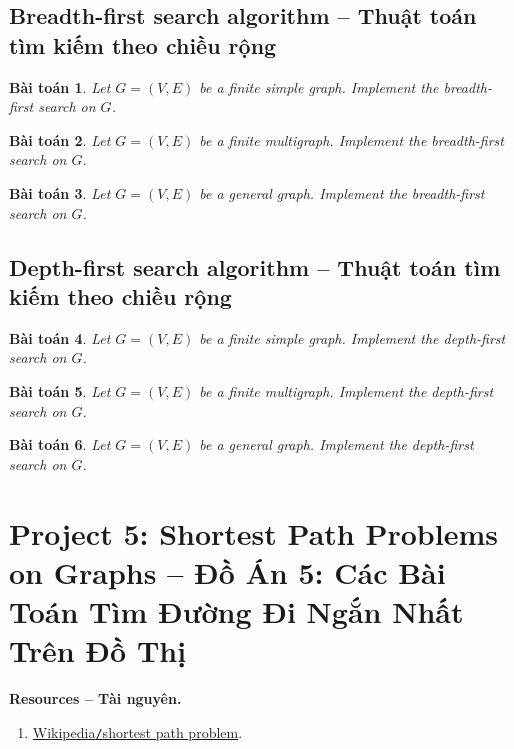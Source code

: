 \documentclass{article}
\newtheorem{baitoan}{Bài toán}
\begin{document}

\subsection{Breadth-first search algorithm -- Thuật toán tìm kiếm theo chiều rộng}

\begin{baitoan}
    Let $G = (V,E)$ be a finite simple graph. Implement the breadth-first search on $G$.
\end{baitoan}

\begin{baitoan}
    Let $G = (V,E)$ be a finite multigraph. Implement the breadth-first search on $G$.
\end{baitoan}

\begin{baitoan}
    Let $G = (V,E)$ be a general graph. Implement the breadth-first search on $G$.
\end{baitoan}


\subsection{Depth-first search algorithm -- Thuật toán tìm kiếm theo chiều rộng}

\begin{baitoan}
    Let $G = (V,E)$ be a finite simple graph. Implement the depth-first search on $G$.
\end{baitoan}

\begin{baitoan}
    Let $G = (V,E)$ be a finite multigraph. Implement the depth-first search on $G$.
\end{baitoan}

\begin{baitoan}
    Let $G = (V,E)$ be a general graph. Implement the depth-first search on $G$.
\end{baitoan}


\section{Project 5: Shortest Path Problems on Graphs -- Đồ Án 5: Các Bài Toán Tìm Đường Đi Ngắn Nhất Trên Đồ Thị}
\textbf{\textsf{Resources -- Tài nguyên.}}
\begin{enumerate}
    \item \href{https://en.wikipedia.org/wiki/Shortest_path_problem}{Wikipedia{\tt/}shortest path problem}.
\end{enumerate}
\end{document}
